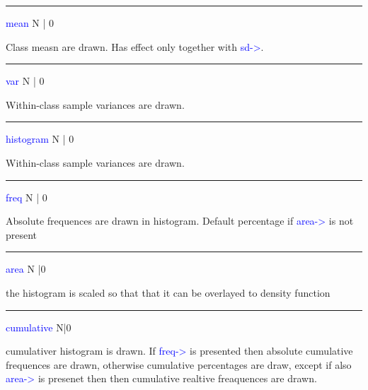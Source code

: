 \vspace{0.3cm} 
\hrule 
\vspace{0.3cm} 
\noindent \textcolor{blue}{mean}  \tabto{3cm}  N | 0  \tabto{5cm}    \tabto{7cm} 
\begin{changemargin}{3cm}{0cm} 
\noindent  Class measn are drawn. Has effect only together with \textcolor{blue}{sd->}. 
\end{changemargin} 
\vspace{0.3cm} 
\hrule 
\vspace{0.3cm} 
\noindent \textcolor{blue}{var}  \tabto{3cm}  N | 0  \tabto{5cm}     \tabto{7cm} 
\begin{changemargin}{3cm}{0cm} 
\noindent Within-class sample variances are drawn. 
\end{changemargin} 
\vspace{0.3cm} 
\hrule 
\vspace{0.3cm} 
\noindent \textcolor{blue}{histogram}  \tabto{3cm}   N | 0  \tabto{5cm}     \tabto{7cm} 
\begin{changemargin}{3cm}{0cm} 
\noindent Within-class sample variances are drawn. 
\end{changemargin} 
\vspace{0.3cm} 
\hrule 
\vspace{0.3cm} 
\noindent \textcolor{blue}{freq}  \tabto{3cm}  N | 0  \tabto{5cm}     \tabto{7cm} 
\begin{changemargin}{3cm}{0cm} 
\noindent  Absolute  frequences are drawn in histogram. Default 
percentage if \textcolor{blue}{area->} is not present 
\end{changemargin} 
\vspace{0.3cm} 
\hrule 
\vspace{0.3cm} 
\noindent \textcolor{blue}{area}  \tabto{3cm}  N |0  \tabto{5cm}    \tabto{7cm} 
\begin{changemargin}{3cm}{0cm} 
\noindent the histogram is scaled so that that it can be overlayed to density function 
\end{changemargin} 
\vspace{0.3cm} 
\hrule 
\vspace{0.3cm} 
\noindent \textcolor{blue}{cumulative}  \tabto{3cm} N|0  \tabto{5cm}    \tabto{7cm} 
\begin{changemargin}{3cm}{0cm} 
\noindent  cumulativer histogram is drawn. If \textcolor{blue}{freq->} is presented then absolute 
cumulative frequences are drawn, otherwise cumulative percentages are draw, except if also \textcolor{blue}{area->} 
is presenet then then cumulative realtive freaquences are drawn. 
\end {changemargin} 
